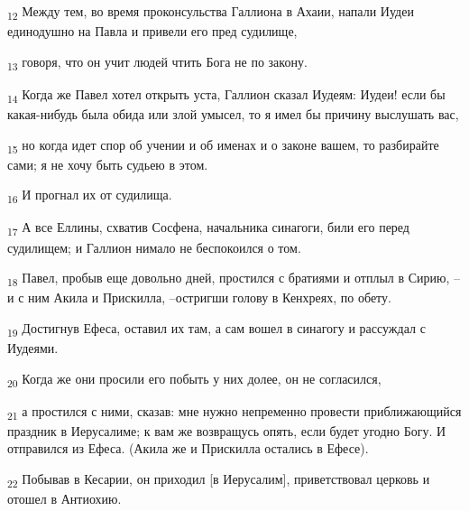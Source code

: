\begin{tcolorbox}
\textsubscript{12} Между тем, во время проконсульства Галлиона в Ахаии, напали Иудеи единодушно на Павла и привели его пред судилище,
\end{tcolorbox}
\begin{tcolorbox}
\textsubscript{13} говоря, что он учит людей чтить Бога не по закону.
\end{tcolorbox}
\begin{tcolorbox}
\textsubscript{14} Когда же Павел хотел открыть уста, Галлион сказал Иудеям: Иудеи! если бы какая-нибудь была обида или злой умысел, то я имел бы причину выслушать вас,
\end{tcolorbox}
\begin{tcolorbox}
\textsubscript{15} но когда идет спор об учении и об именах и о законе вашем, то разбирайте сами; я не хочу быть судьею в этом.
\end{tcolorbox}
\begin{tcolorbox}
\textsubscript{16} И прогнал их от судилища.
\end{tcolorbox}
\begin{tcolorbox}
\textsubscript{17} А все Еллины, схватив Сосфена, начальника синагоги, били его перед судилищем; и Галлион нимало не беспокоился о том.
\end{tcolorbox}
\begin{tcolorbox}
\textsubscript{18} Павел, пробыв еще довольно дней, простился с братиями и отплыл в Сирию, --и с ним Акила и Прискилла, --остригши голову в Кенхреях, по обету.
\end{tcolorbox}
\begin{tcolorbox}
\textsubscript{19} Достигнув Ефеса, оставил их там, а сам вошел в синагогу и рассуждал с Иудеями.
\end{tcolorbox}
\begin{tcolorbox}
\textsubscript{20} Когда же они просили его побыть у них долее, он не согласился,
\end{tcolorbox}
\begin{tcolorbox}
\textsubscript{21} а простился с ними, сказав: мне нужно непременно провести приближающийся праздник в Иерусалиме; к вам же возвращусь опять, если будет угодно Богу. И отправился из Ефеса. (Акила же и Прискилла остались в Ефесе).
\end{tcolorbox}
\begin{tcolorbox}
\textsubscript{22} Побывав в Кесарии, он приходил [в Иерусалим], приветствовал церковь и отошел в Антиохию.
\end{tcolorbox}

